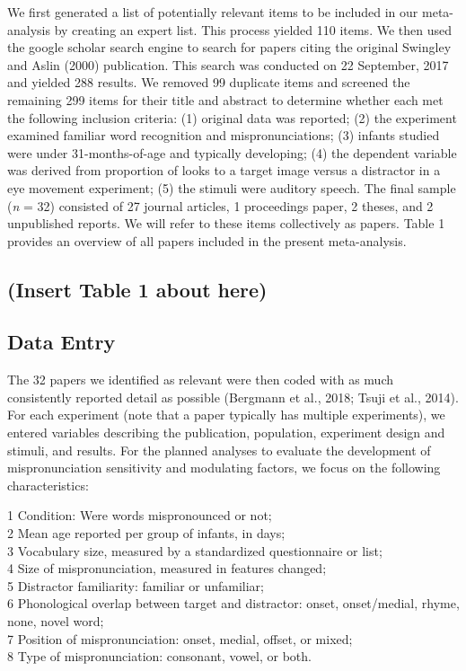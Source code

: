 \documentclass[man]{apa6}
\theoremstyle{definition}
\theoremstyle{definition}
\theoremstyle{definition}
\theoremstyle{remark}
\begin{document}
We first generated a list of potentially relevant items to be included
in our meta-analysis by creating an expert list. This process yielded
110 items. We then used the google scholar search engine to search for
papers citing the original Swingley and Aslin (2000) publication. This
search was conducted on 22 September, 2017 and yielded 288 results. We
removed 99 duplicate items and screened the remaining 299 items for
their title and abstract to determine whether each met the following
inclusion criteria: (1) original data was reported; (2) the experiment
examined familiar word recognition and mispronunciations; (3) infants
studied were under 31-months-of-age and typically developing; (4) the
dependent variable was derived from proportion of looks to a target
image versus a distractor in a eye movement experiment; (5) the stimuli
were auditory speech. The final sample (\emph{n} = 32) consisted of 27
journal articles, 1 proceedings paper, 2 theses, and 2 unpublished
reports. We will refer to these items collectively as papers. Table 1
provides an overview of all papers included in the present
meta-analysis.

\subsection{(Insert Table 1 about
here)}\label{insert-table-1-about-here}

\subsection{Data Entry}\label{data-entry}

The 32 papers we identified as relevant were then coded with as much
consistently reported detail as possible (Bergmann et al., 2018; Tsuji
et al., 2014). For each experiment (note that a paper typically has
multiple experiments), we entered variables describing the publication,
population, experiment design and stimuli, and results. For the planned
analyses to evaluate the development of mispronunciation sensitivity and
modulating factors, we focus on the following characteristics:

1 Condition: Were words mispronounced or not;\\
2 Mean age reported per group of infants, in days;\\
3 Vocabulary size, measured by a standardized questionnaire or list;\\
4 Size of mispronunciation, measured in features changed;\\
5 Distractor familiarity: familiar or unfamiliar;\\
6 Phonological overlap between target and distractor: onset,
onset/medial, rhyme, none, novel word;\\
7 Position of mispronunciation: onset, medial, offset, or mixed;\\
8 Type of mispronunciation: consonant, vowel, or both.
\end{document}
